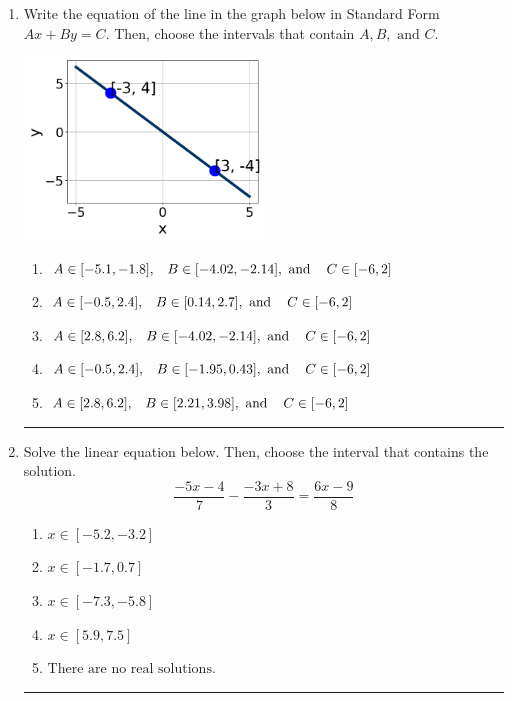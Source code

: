 \documentclass[14pt]{extbook}
\newcommand{\litem}[1]{\item#1\hspace*{-1cm}\rule{\textwidth}{0.4pt}}
\begin{document}
\begin{enumerate}
{\begin{enumerate}[label=\Alph*.]
\end{enumerate} }
\litem{
Write the equation of the line in the graph below in Standard Form $Ax+By=C$. Then, choose the intervals that contain $A, B, \text{ and } C$.
\begin{center}
    \includegraphics[width=0.5\textwidth]{../Figures/linearGraphToStandardC.png}
\end{center}
\begin{enumerate}[label=\Alph*.]
\item \( A \in [-5.1, -1.8], \hspace{3mm} B \in [-4.02, -2.14], \text{ and } \hspace{3mm} C \in [-6, 2] \)
\item \( A \in [-0.5, 2.4], \hspace{3mm} B \in [0.14, 2.7], \text{ and } \hspace{3mm} C \in [-6, 2] \)
\item \( A \in [2.8, 6.2], \hspace{3mm} B \in [-4.02, -2.14], \text{ and } \hspace{3mm} C \in [-6, 2] \)
\item \( A \in [-0.5, 2.4], \hspace{3mm} B \in [-1.95, 0.43], \text{ and } \hspace{3mm} C \in [-6, 2] \)
\item \( A \in [2.8, 6.2], \hspace{3mm} B \in [2.21, 3.98], \text{ and } \hspace{3mm} C \in [-6, 2] \)

\end{enumerate} }
\litem{
Solve the linear equation below. Then, choose the interval that contains the solution.\[ \frac{-5x -4}{7} - \frac{-3x + 8}{3} = \frac{6x -9}{8} \]\begin{enumerate}[label=\Alph*.]
\item \( x \in [-5.2, -3.2] \)
\item \( x \in [-1.7, 0.7] \)
\item \( x \in [-7.3, -5.8] \)
\item \( x \in [5.9, 7.5] \)
\item \( \text{There are no real solutions.} \)


\end{enumerate}}
\end{enumerate}
\end{document}
